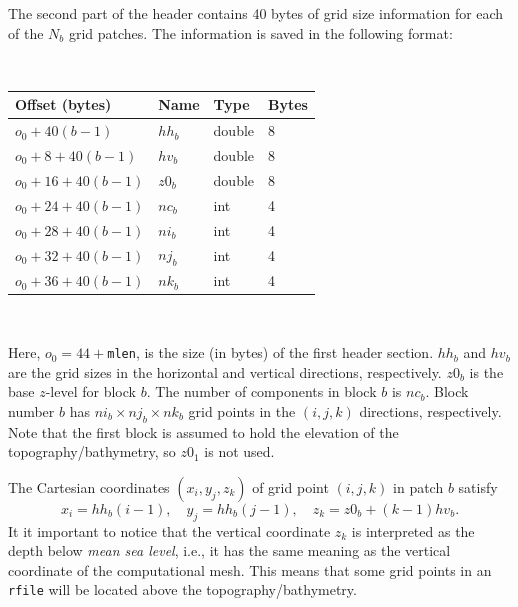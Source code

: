 \documentclass[11pt]{report}
\begin{document}
The second part of the header contains 40 bytes of grid size information for each of the $N_b$ grid
patches. The information is saved in the following format:
\begin{center}
\hspace{-35mm}{\tt for ($b=1$; $b\leq N_b$; $b$++) }\nopagebreak \\ 
\vspace{2mm}
\begin{tabular}{llll}\hline
Offset (bytes) & Name & Type & Bytes \\ \hline
$o_0 + 40(b - 1)$ & $hh_{b}$ & double & 8 \\ \hline
$o_0 + 8 + 40(b - 1)$ & $hv_{b}$ & double & 8 \\ \hline
$o_0 + 16 + 40(b - 1)$ & $z0_{b}$ & double & 8 \\ \hline
$o_0 + 24 + 40(b - 1)$ & $nc_{b}$ & int & 4 \\ \hline
$o_0 + 28 + 40(b - 1)$ & $ni_{b}$ & int & 4 \\ \hline
$o_0 + 32 + 40(b - 1)$ & $nj_{b}$ & int & 4 \\ \hline
$o_0 + 36 + 40(b - 1)$ & $nk_{b}$ & int & 4 \\ \hline
\end{tabular}\\
\end{center} 
Here, $o_0=44+${\tt mlen}, is the size (in bytes) of the first header section. $hh_b$ and $hv_b$ are
the grid sizes in the horizontal and vertical directions, respectively. $z0_b$ is the base $z$-level
for block $b$. The number of components in block $b$ is $nc_b$. Block number $b$ has $ni_b\times
nj_b\times nk_b$ grid points in the $(i,j,k)$ directions, respectively. Note that the first block is
assumed to hold the elevation of the topography/bathymetry, so $z0_1$ is not used. 

The Cartesian coordinates $(x_i, y_j, z_k)$ of grid point $(i,j,k)$ in patch $b$ satisfy
\[
x_i = hh_b(i-1),\quad y_j = hh_b(j-1),\quad z_k = z0_b + (k-1)hv_b.
\]
It it important to notice that the vertical coordinate $z_k$ is interpreted as the depth below {\em
  mean sea level}, i.e., it has the same meaning as the vertical coordinate of the computational
mesh. This means that some grid points in an {\tt rfile} will be located above the topography/bathymetry.
\end{document}
